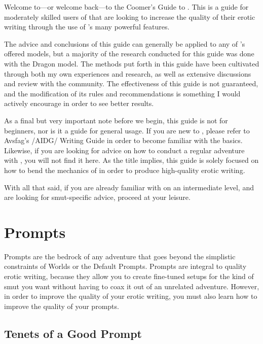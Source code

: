 ﻿\documentclass[Coomer-main.tex]{subfiles}
\begin{document}
\label{ch:preface}

 Welcome to—or welcome back—to the Coomer's Guide to \aid.
This is a guide for moderately skilled users of \aid that are looking to increase the quality of their erotic writing through the use of \aid's many powerful features.

The advice and conclusions of this guide can generally be applied to any of \aid's offered models, but a majority of the research conducted for this guide was done with the Dragon model.
The methods put forth in this guide have been cultivated through both my own experiences and research, as well as extensive discussions and review with the \aid community.
The effectiveness of this guide is not guaranteed, and the modification of its rules and recommendations is something I would actively encourage in order to see better results.

As a final but very important note before we begin, this guide is not for beginners, nor is it a guide for general usage.
If you are new to \aid, please refer to Avsfag's /AIDG/ Writing Guide in order to become familiar with the basics.
Likewise, if you are looking for advice on how to conduct a regular adventure with \aid, you will not find it here.
As the title implies, this guide is solely focused on how to bend the mechanics of \aid in order to produce high-quality erotic writing.

With all that said, if you are already familiar with \aid on an intermediate level, and are looking for smut-specific advice, proceed at your leisure.

\chapter{Prompts}
\label{ch:prompts}

Prompts are the bedrock of any \aid adventure that goes beyond the simplistic constraints of Worlds or the Default Prompts.
Prompts are integral to quality erotic writing, because they allow you to create fine-tuned setups for the kind of smut you want without having to coax it out of an unrelated adventure.
However, in order to improve the quality of your erotic writing, you must also learn how to improve the quality of your prompts.

\section{Tenets of a Good Prompt}
\label{sec:tenets}
\end{document}
